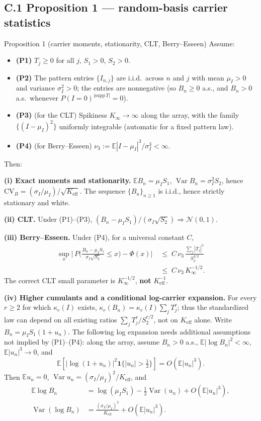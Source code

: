 \subsection{C.1 Proposition 1 --- random-basis carrier statistics}

\begin{namedthm}{Proposition 1 (carrier moments, stationarity, CLT, Berry--Esseen)}
Assume:
\begin{itemize}
\item \textbf{(P1)} $T_j\ge 0$ for all $j$, $S_1>0$, $S_2>0$.
\item \textbf{(P2)} The pattern entries $\{I_{n,j}\}$ are i.i.d.\ across $n$ and $j$ with mean $\mu_I>0$ and variance $\sigma_I^2>0$; the entries are nonnegative (so $B_n\ge 0$ a.s., and $B_n>0$ a.s.\ whenever $P(I=0)^{|\mathrm{supp}\,T|}=0$).
\item \textbf{(P3)} (for the CLT) Spikiness $K_\infty\to\infty$ along the array, with the family $\{(I-\mu_I)^2\}$ uniformly integrable (automatic for a fixed pattern law).
\item \textbf{(P4)} (for Berry--Esseen) $\nu_3 := \mathbb{E}|I-\mu_I|^3/\sigma_I^3<\infty$.
\end{itemize}
Then:

\textbf{(i) Exact moments and stationarity.} $\mathbb{E}B_n=\mu_I S_1$, $\operatorname{Var}B_n=\sigma_I^2 S_2$, hence $\mathrm{CV}_B=(\sigma_I/\mu_I)/\sqrt{K_{\mathrm{eff}}}$. The sequence $\{B_n\}_{n\ge1}$ is i.i.d., hence strictly stationary and white.

\textbf{(ii) CLT.} Under (P1)--(P3), $(B_n-\mu_I S_1)/(\sigma_I\sqrt{S_2}) \Rightarrow \mathcal N(0,1)$.

\textbf{(iii) Berry--Esseen.} Under (P4), for a universal constant $C$,
\[
\begin{aligned}
\sup_x\Big|\,P\Big(\tfrac{B_n-\mu_I S_1}{\sigma_I\sqrt{S_2}}\le x\Big)-\Phi(x)\Big|
&\;\le\; C\,\nu_3\,\frac{\sum_j |T_j|^3}{S_2^{3/2}}\\
&\;\le\; C\,\nu_3\,K_\infty^{-1/2}.
\end{aligned}
\]
The correct CLT small parameter is $K_\infty^{-1/2}$, \textbf{not} $K_{\mathrm{eff}}^{-1}$.

\textbf{(iv) Higher cumulants and a conditional log-carrier expansion.} For every $r\ge2$ for which $\kappa_r(I)$ exists, $\kappa_r(B_n)=\kappa_r(I)\sum_jT_j^r$; thus the standardized law can depend on all existing ratios $\sum_jT_j^r/S_2^{r/2}$, not on $K_{\mathrm{eff}}$ alone. Write $B_n=\mu_IS_1(1+u_n)$. The following log expansion needs additional assumptions not implied by (P1)--(P4): along the array, assume $B_n>0$ a.s., $\mathbb E|\log B_n|^2<\infty$, $\mathbb E|u_n|^3\to0$, and
\[
\mathbb E\!\left[|\log(1+u_n)|^2
 \mathbf1\{|u_n|>\tfrac12\}\right]
=O(\mathbb E|u_n|^3).
\]
Then $\mathbb{E}u_n=0$, $\operatorname{Var}u_n=(\sigma_I/\mu_I)^2/K_{\mathrm{eff}}$, and
\[
\begin{aligned}
\mathbb{E}\log B_n&=\log(\mu_I S_1)-\tfrac12\operatorname{Var}(u_n)+O(\mathbb{E}|u_n|^3),\\
\operatorname{Var}(\log B_n)&=\frac{(\sigma_I/\mu_I)^2}{K_{\mathrm{eff}}}+O(\mathbb{E}|u_n|^3).
\end{aligned}
\]
\end{namedthm}

